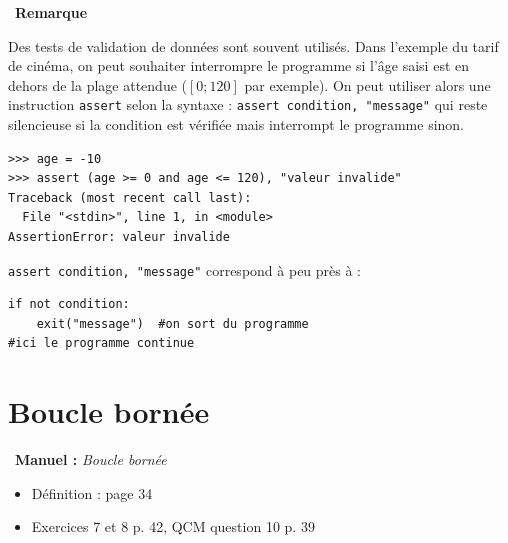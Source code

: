 \documentclass[a4paper, french, 12pt]{article}  %
\newcounter{rque}
\newenvironment{remarque}
{\par \medskip    \addtocounter{rque}{1} \noindent  
\begin{bclogo}[arrondi =0.1,  ombre = true, barre=snake, noborder = true, logo=\bcinfo, marge=0]{~\textbf{Remarque} \textbf{\therque}}  \par }
{
\end{bclogo}
 \par \bigskip }
\newcounter{prog}
\newenvironment{manuel}[1]
{\par \medskip  \noindent  
\begin{bclogo}[arrondi =0.1,   noborder = true, logo=\bcoeil, marge=4]{~\textbf{Manuel :}  {\itshape #1} }  \itshape \par}
{
\end{bclogo}
 \par \bigskip }
\begin{document}
\begin{remarque}{}

Des tests de validation de données sont souvent utilisés. Dans l'exemple du tarif de cinéma, on peut souhaiter interrompre le  programme si l'âge saisi est  en dehors de la plage attendue ($[0;120]$ par exemple). On peut utiliser alors une instruction  \texttt{assert} selon la syntaxe   : \texttt{assert condition, "message"} qui reste silencieuse si la condition est vérifiée mais interrompt le programme sinon.

\begin{lstlisting}[style=compil]
>>> age = -10
>>> assert (age >= 0 and age <= 120), "valeur invalide"
Traceback (most recent call last):
  File "<stdin>", line 1, in <module>
AssertionError: valeur invalide
\end{lstlisting}

\texttt{assert condition, "message"} correspond à peu près à  :

\begin{lstlisting}[style=compil]
if not condition:
	exit("message")  #on sort du programme
#ici le programme continue
\end{lstlisting}

\end{remarque}

\section{Boucle bornée}


\begin{manuel}{Boucle bornée}
\begin{itemize}[label=]
 \item Définition  : page 34
 \item Exercices 7 et 8 p. 42, QCM question 10  p. 39
\end{itemize}
\end{manuel}
\end{document}
